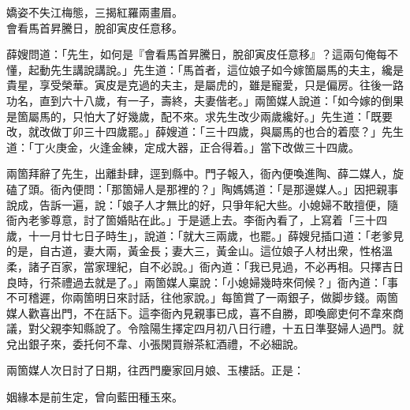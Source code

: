 \begin{myquote}
嬌姿不失江梅態，三揭紅羅兩畫眉。\\會看馬首昇騰日，脫卻寅皮任意移。
\end{myquote}

薛嫂問道：「先生，如何是『會看馬首昇騰日，脫卻寅皮任意移』？這兩句俺每不懂，起動先生講說講說。」先生道：「馬首者，這位娘子如今嫁箇屬馬的夫主，纔是貴星，享受榮華。寅皮是克過的夫主，是屬虎的，雖是寵愛，只是偏房。往後一路功名，直到六十八歲，有一子，壽終，夫妻偕老。」兩箇媒人說道：「如今嫁的倒果是箇屬馬的，只怕大了好幾歲，配不來。求先生改少兩歲纔好。」先生道：「既要改，就改做丁卯三十四歲罷。」薛嫂道：「三十四歲，與屬馬的也合的着麼？」先生道：「丁火庚金，火逢金練，定成大器，正合得着。」當下改做三十四歲。

兩箇拜辭了先生，出離卦肆，逕到縣中。門子報入，衙內便喚進陶、薛二媒人，旋磕了頭。衙內便問：「那箇婦人是那裡的？」陶媽媽道：「是那邊媒人。」因把親事說成，告訴一遍，說：「娘子人才無比的好，只爭年紀大些。小媳婦不敢擅便，隨衙內老爹尊意，討了箇婚貼在此。」于是遞上去。李衙內看了，上寫着「三十四歲，十一月廿七日子時生」，說道：「就大三兩歲，也罷。」薛嫂兒插口道：「老爹見的是，自古道，妻大兩，黃金長；妻大三，黃金山。{}這位娘子人材出衆，性格溫柔，諸子百家，當家理紀，自不必說。」衙內道：「我已見過，不必再相。只擇吉日良時，行茶禮過去就是了。」兩箇媒人稟說：「小媳婦幾時來伺候？」衙內道：「事不可稽遲，你兩箇明日來討話，往他家說。」每箇賞了一兩銀子，做脚步錢。兩箇媒人歡喜出門，不在話下。這李衙內見親事已成，喜不自勝，即喚廊吏何不韋來商議，對父親李知縣說了。令陰陽生擇定四月初八日行禮，十五日準娶婦人過門。就兌出銀子來，委托何不韋、小張閑買辦茶紅酒禮，不必細說。

兩箇媒人次日討了日期，往西門慶家回月娘、玉樓話。正是：

\begin{myquote}
姻緣本是前生定，曾向藍田種玉來。
\end{myquote}


